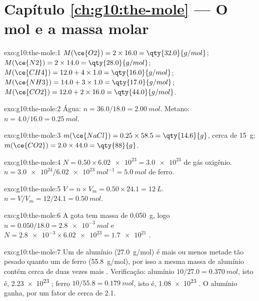 \section*{Capítulo \ref{ch:g10:the-mole} --- O mol e a massa molar}

\begin{solution}{exo:g10:the-mole:1}
$M(\ce{O2}) = 2 \times 16.0 = \qty{32.0}{g/mol}$;
$M(\ce{N2}) = 2 \times 14.0 = \qty{28.0}{g/mol}$;
$M(\ce{CH4}) = 12.0 + 4 \times 1.0 = \qty{16.0}{g/mol}$;
$M(\ce{NH3}) = 14.0 + 3 \times 1.0 = \qty{17.0}{g/mol}$;
$M(\ce{CO2}) = 12.0 + 2 \times 16.0 = \qty{44.0}{g/mol}$.
\end{solution}

\begin{solution}{exo:g10:the-mole:2}
Água: $n = 36.0 / 18.0 = \qty{2.00}{mol}$. Metano:
$n = 4.0 / 16.0 = \qty{0.25}{mol}$.
\end{solution}

\begin{solution}{exo:g10:the-mole:3}
$m(\ce{NaCl}) = 0.25 \times 58.5 = \qty{14.6}{g}$, cerca de \qty{15}{g};
$m(\ce{CO2}) = 2.0 \times 44.0 = \qty{88}{g}$.
\end{solution}

\begin{solution}{exo:g10:the-mole:4}
$N = 0.50 \times \num{6.02e23} = \num{3.0e23}$  de gás oxigênio.
$n = \num{3.0e24} / \qty{6.02e23}{mol^{-1}} = \qty{5.0}{mol}$ de ferro.
\end{solution}

\begin{solution}{exo:g10:the-mole:5}
$V = n \times V_m = 0.50 \times 24.1 = \qty{12}{L}$.
$n = V / V_m = 12 / 24.1 = \qty{0.50}{mol}$.
\end{solution}

\begin{solution}{exo:g10:the-mole:6}
A gota tem massa de \qty{0.050}{g}, logo
$n = 0.050 / 18.0 = \qty{2.8e-3}{mol}$ e
$N = \num{2.8e-3} \times \num{6.02e23} = \num{1.7e21}$ .
\end{solution}

\begin{solution}{exo:g10:the-mole:7}
Um  de alumínio (\qty{27.0}{g/mol}) é mais ou menos metade tão
pesado quanto um  de ferro (\qty{55.8}{g/mol}), por isso a mesma
massa de alumínio contém cerca de duas vezes mais . Verificação:
alumínio $10/27.0 = \qty{0.370}{mol}$, isto é,
\num{2.23e23} ; ferro $10/55.8 = \qty{0.179}{mol}$, isto é,
\num{1.08e23} . O alumínio ganha, por um fator de cerca de 2.1.
\end{solution}

